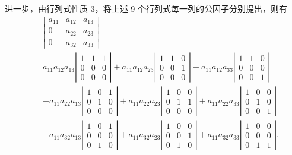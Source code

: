 \documentclass[UTF8, 12pt, fontset=fandol, oneside]{ctexart}
\begin{document}
进一步，由行列式性质 3，将上述 9 个行列式每一列的公因子分别提出，则有
\[
\begin{aligned}
&\left|\begin{array}{ccc}
a_{11} & a_{12} & a_{13}\\
0 & a_{22} & a_{23}\\
0 & a_{32} & a_{33}
\end{array}\right|\\
={}&
a_{11}a_{12}a_{13}\left|\begin{array}{ccc}1&1&1\\0&0&0\\0&0&0\end{array}\right|
+a_{11}a_{12}a_{23}\left|\begin{array}{ccc}1&1&0\\0&0&1\\0&0&0\end{array}\right|
+a_{11}a_{12}a_{33}\left|\begin{array}{ccc}1&1&0\\0&0&0\\0&0&1\end{array}\right|\\
&+a_{11}a_{22}a_{13}\left|\begin{array}{ccc}1&0&1\\0&1&0\\0&0&0\end{array}\right|
+a_{11}a_{22}a_{23}\left|\begin{array}{ccc}1&0&0\\0&1&1\\0&0&0\end{array}\right|
+a_{11}a_{22}a_{33}\left|\begin{array}{ccc}1&0&0\\0&1&0\\0&0&1\end{array}\right|\\
&+a_{11}a_{32}a_{13}\left|\begin{array}{ccc}1&0&1\\0&0&0\\0&1&0\end{array}\right|
+a_{11}a_{32}a_{23}\left|\begin{array}{ccc}1&0&0\\0&0&1\\0&1&0\end{array}\right|
+a_{11}a_{32}a_{33}\left|\begin{array}{ccc}1&0&0\\0&0&0\\0&1&1\end{array}\right|.
\end{aligned}
\]
\end{document}
